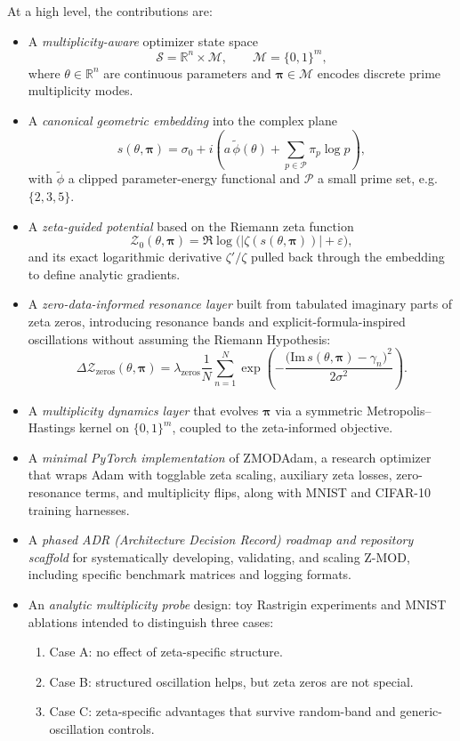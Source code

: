 \documentclass[11pt]{article}
\begin{document}
At a high level, the contributions are:
\begin{itemize}[leftmargin=*]
  \item A \emph{multiplicity-aware} optimizer state space
  \[
    \mathcal{S} = \mathbb{R}^n \times \mathcal{M}, \qquad \mathcal{M} = \{0,1\}^m,
  \]
  where $\theta \in \mathbb{R}^n$ are continuous parameters and $\bm{\pi} \in \mathcal{M}$ encodes discrete prime multiplicity modes.
  \item A \emph{canonical geometric embedding} into the complex plane
  \[
    s(\theta, \bm{\pi}) = \sigma_0 + i\left(a\,\tilde{\phi}(\theta) + \sum_{p\in\mathcal{P}} \pi_p \log p\right),
  \]
  with $\tilde{\phi}$ a clipped parameter-energy functional and $\mathcal{P}$ a small prime set, e.g.\ $\{2,3,5\}$.
  \item A \emph{zeta-guided potential} based on the Riemann zeta function
  \[
    \mathcal{Z}_0(\theta,\bm{\pi}) = \Re \log\big(|\zeta(s(\theta,\bm{\pi}))| + \varepsilon\big),
  \]
  and its exact logarithmic derivative $\zeta'/\zeta$ pulled back through the embedding to define analytic gradients.
  \item A \emph{zero-data-informed resonance layer} built from tabulated imaginary parts of zeta zeros, introducing resonance bands and explicit-formula-inspired oscillations without assuming the Riemann Hypothesis:
  \[
    \Delta \mathcal{Z}_{\mathrm{zeros}}(\theta,\bm{\pi}) = \lambda_{\mathrm{zeros}} \frac{1}{N}\sum_{n=1}^N
      \exp\left(-\frac{\big(\mathrm{Im}\,s(\theta,\bm{\pi}) - \gamma_n\big)^2}{2\sigma^2}\right).
  \]
  \item A \emph{multiplicity dynamics layer} that evolves $\bm{\pi}$ via a symmetric Metropolis--Hastings kernel on $\{0,1\}^m$, coupled to the zeta-informed objective.
  \item A \emph{minimal PyTorch implementation} of ZMODAdam, a research optimizer that wraps Adam with togglable zeta scaling, auxiliary zeta losses, zero-resonance terms, and multiplicity flips, along with MNIST and CIFAR-10 training harnesses.
  \item A \emph{phased ADR (Architecture Decision Record) roadmap and repository scaffold} for systematically developing, validating, and scaling Z-MOD, including specific benchmark matrices and logging formats.
  \item An \emph{analytic multiplicity probe} design: toy Rastrigin experiments and MNIST ablations intended to distinguish three cases:
  \begin{enumerate}
    \item Case A: no effect of zeta-specific structure.
    \item Case B: structured oscillation helps, but zeta zeros are not special.
    \item Case C: zeta-specific advantages that survive random-band and generic-oscillation controls.
  \end{enumerate}
\end{itemize}
\end{document}
